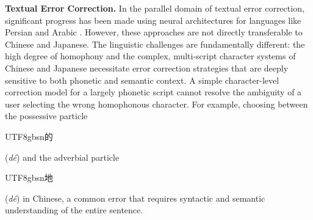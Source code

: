 \documentclass[10pt, a4paper]{article}
\begin{document}
\textbf{Textual Error Correction.}
In the parallel domain of textual error correction, significant progress has been made using neural architectures for languages like Persian and Arabic \citep{dashti2024percore, alkhatib2020deep, kasmaiee2023correcting}. However, these approaches are not directly transferable to Chinese and Japanese. The linguistic challenges are fundamentally different: the high degree of homophony and the complex, multi-script character systems of Chinese and Japanese necessitate error correction strategies that are deeply sensitive to both phonetic and semantic context. A simple character-level correction model for a largely phonetic script cannot resolve the ambiguity of a user selecting the wrong homophonous character. For example, choosing between the possessive particle \begin{CJK*}{UTF8}{gbsn}的\end{CJK*} (\textit{d\'{e}}) and the adverbial particle \begin{CJK*}{UTF8}{gbsn}地\end{CJK*} (\textit{d\'{e}}) in Chinese, a common error that requires syntactic and semantic understanding of the entire sentence.
\end{document}
